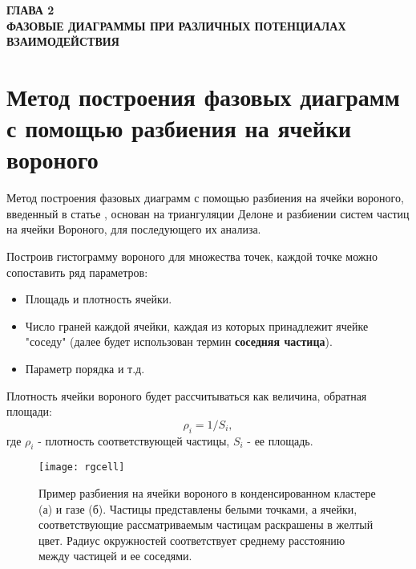 
\newpage
\begin{center}
\textbf{ГЛАВА 2}\\
\textbf{ФАЗОВЫЕ ДИАГРАММЫ ПРИ РАЗЛИЧНЫХ ПОТЕНЦИАЛАХ ВЗАИМОДЕЙСТВИЯ}
\end{center}


\section{Метод построения фазовых диаграмм с помощью разбиения на ячейки вороного}\label{C2_1}

Метод построения фазовых диаграмм с помощью разбиения на ячейки вороного, введенный в статье \cite{Ovcharov2017}, основан на триангуляции Делоне и разбиении систем частиц на ячейки Вороного, для последующего их анализа.

Построив гистограмму вороного для множества точек, каждой точке можно сопоставить ряд параметров:
\begin{itemize}
\item Площадь и плотность ячейки.
\item Число граней каждой ячейки, каждая из которых принадлежит ячейке "соседу" (далее будет использован термин \textbf{соседняя частица}).
\item Параметр порядка и т.д.
\end{itemize}
Плотность ячейки вороного будет рассчитываться как величина, обратная площади:
\begin{equation}
\rho_i = 1 / S_i,
\label{eqRho}
\end{equation}
где $\rho_i$ - плотность соответствующей частицы, $S_i$ - ее площадь.

\begin{figure}[h]
\begin{center}
\texttt{[image: rgcell]}
\caption{Пример разбиения на ячейки вороного в конденсированном кластере (а) и газе (б). Частицы представлены белыми точками, а ячейки, соответствующие рассматриваемым частицам раскрашены в желтый цвет. Радиус окружностей соответствует среднему расстоянию между частицей и ее соседями.}
\label{risFlucMed}
\end{center}
\end{figure}

